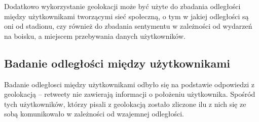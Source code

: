 Dodatkowo wykorzystanie geolokacji może być użyte do zbadania odległości między 
użytkownikami tworzącymi sieć społeczną, o tym w jakiej odległości są oni od stadionu,
czy również do zbadania sentymentu w zależności od wydarzeń na boisku,
a miejscem przebywania danych użytkowników. 



\subsection{Badanie odległości między użytkownikami}
\label{subsection:badanieodleglosci}
Badanie odległosci między użytkownikami odbyło się na podstawie odpowiedzi z
geolokacją -- retweety nie zawierają informacji o położeniu użytkownika.
Spośród tych użytkowników, którzy pisali z geolokacją zostało zliczone ilu z
nich się ze sobą komunikowało w zależności od wzajemnej odległości.








